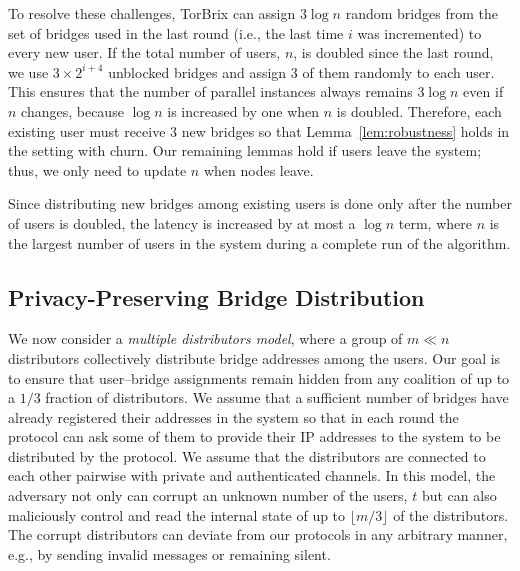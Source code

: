 \documentclass{llncs}
\newcommand{\eg}{e.g.}
\newcommand{\ie}{i.e.}
\newcommand{\jared}[1]{}
\newcommand{\sfsize}{\fontsize{0.73\baselineskip}{0.73\baselineskip}\selectfont}
\newcommand{\sans}[1]{\textsf{\sfsize \mbox{#1}}}
\newcommand{\brix}{\sans{TorBrix}\xspace}
\begin{document}
To resolve these challenges, \brix can assign $3\log{n}$ random bridges from the set of bridges used in the last round (\ie, the last time $i$ was incremented) to every new user.  If the total number of users, $n$, is doubled since the last round, we use $3 \times 2^{i+4}$ unblocked bridges and assign $3$ of them randomly to each user.  This ensures that the number of parallel instances always remains $3\log{n}$ even if $n$ changes, because $\log{n}$ is increased by one when $n$ is doubled. Therefore, each existing user must receive $3$ new bridges so that Lemma~\ref{lem:robustness} holds in the setting with churn.\jared{This last sentence is confusing.  Are you suggesting another change to the algorithm, or is this to justify the previous change?} Our remaining lemmas hold if users leave the system; thus, we only need to update $n$ when nodes leave.




Since distributing new bridges among existing users is done only after the number of users is doubled, the latency is increased by at most a $\log{n}$ term, where $n$ is the largest number of users in the system during a complete run of the algorithm.

\subsection{Privacy-Preserving Bridge Distribution} \label{sec:multi-dist}
We now consider a \emph{multiple distributors model}, where a group of \mbox{$m \ll n$} distributors collectively distribute bridge addresses among the users. 
Our goal is to ensure that user--bridge assignments remain hidden from  any coalition of up to a $1/3$ fraction of distributors. We assume that a sufficient number of bridges have already registered their addresses in the system so that in each round the protocol can ask some of them to provide their IP addresses to the system to be distributed by the protocol.
We assume that the distributors are connected to each other pairwise with private and authenticated channels.
In this model, the adversary not only can corrupt an unknown number of the users, $t$ but can also maliciously control and read the internal state of up to $\lfloor m/3 \rfloor$ of the distributors. The corrupt distributors can deviate from our protocols in any arbitrary manner, \eg, by sending invalid messages or remaining silent. 
\end{document}
